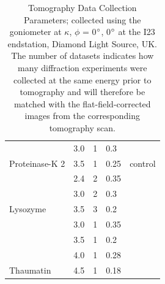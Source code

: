 \begin{table}[h]
{\begin{tabular}{@{}lllll@{}}
                                 & 3.0    & 1             & 0.3                           &                                \\
\multirow{-2}{*}{Proteinase-K 2} & 3.5    & 1             & 0.25                          & \multirow{-2}{*}{control}      \\
                                 & 2.4    & 2             & 0.35                          &                                \\
                                 & 3.0    & 2             & 0.3                           &                                \\
\multirow{-3}{*}{Lysozyme}       & 3.5    & 3             & 0.2                           &                                \\
                                 & 3.0    & 1             & 0.35                          &                                \\
                                 & 3.5    & 1             & 0.2                           &                                \\
                                 & 4.0    & 1             & 0.28                          &                                \\
\multirow{-4}{*}{Thaumatin}      & 4.5    & 1             & 0.18                          &       \\
\bottomrule
\end{tabular}%
}

\caption{Tomography Data Collection Parameters; collected using the goniometer at $\kappa$, $\phi$ = 0$\degree$, 0$\degree$ at the I23 endstation, Diamond Light Source, UK. The number of datasets indicates how many diffraction experiments were collected at the same energy prior to tomography and will therefore be matched with the flat-field-corrected images from the corresponding tomography scan.}
\label{tomo_table}
\end{table}


